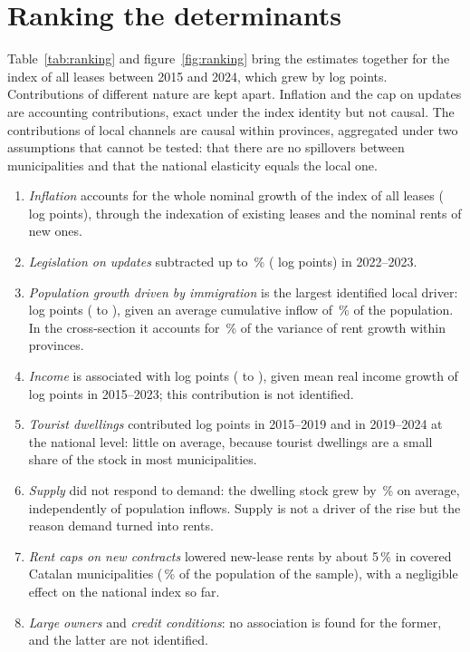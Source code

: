 \documentclass[11pt,a4paper]{article}
\begin{document}
\section{Ranking the determinants}\label{sec:ranking}

Table~\ref{tab:ranking} and figure~\ref{fig:ranking} bring the estimates together for the index of all leases between 2015 and 2024, which grew by \cTotal{} log points. Contributions of different nature are kept apart. Inflation and the cap on updates are accounting contributions, exact under the index identity but not causal. The contributions of local channels are causal within provinces, aggregated under two assumptions that cannot be tested: that there are no spillovers between municipalities and that the national elasticity equals the local one.

\begin{enumerate}
\item \textit{Inflation} accounts for the whole nominal growth of the index of all leases (\cCpi{} log points), through the indexation of existing leases and the nominal rents of new ones.
\item \textit{Legislation on updates} subtracted up to \capGap\,\% (\cCap{} log points) in 2022--2023.
\item \textit{Population growth driven by immigration} is the largest identified local driver: \cPop{} log points (\cPopLo{} to \cPopHi), given an average cumulative inflow of \cPopM\,\% of the population. In the cross-section it accounts for \shPop\,\% of the variance of rent growth within provinces.
\item \textit{Income} is associated with \cInc{} log points (\cIncLo{} to \cIncHi), given mean real income growth of \incReal{} log points in 2015--2023; this contribution is not identified.
\item \textit{Tourist dwellings} contributed \cTourA{} log points in 2015--2019 and \cTourB{} in 2019--2024 at the national level: little on average, because tourist dwellings are a small share of the stock in most municipalities.
\item \textit{Supply} did not respond to demand: the dwelling stock grew by \dlnviv\,\% on average, independently of population inflows. Supply is not a driver of the rise but the reason demand turned into rents.
\item \textit{Rent caps on new contracts} lowered new-lease rents by about 5\,\% in covered Catalan municipalities (\capShare\,\% of the population of the sample), with a negligible effect on the national index so far.
\item \textit{Large owners} and \textit{credit conditions}: no association is found for the former, and the latter are not identified.
\end{enumerate}
\end{document}
